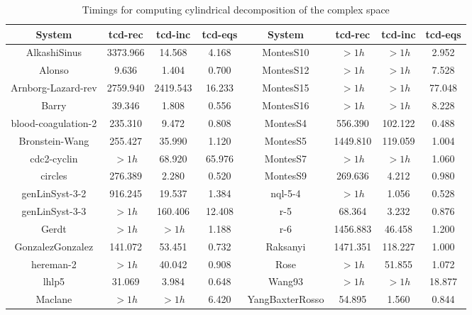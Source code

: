 \documentclass[10pt]{article}
\begin{document}
\begin{table}
\centering
\caption{Timings for computing cylindrical decomposition of the complex space}
\label{table:cd}
\begin{tabular}{|c|c|c|c||c|c|c|c|}\hline
System             & tcd-rec & tcd-inc & tcd-eqs & System & tcd-rec & tcd-inc & tcd-eqs \\ \hline
AlkashiSinus & 	  3373.966 & 	  14.568 & 	  4.168 &MontesS10 &  	 $> 1h$ &  	 $> 1h$ & 	  2.952 \\
Alonso & 	  9.636 & 	  1.404 & 	  0.700 &MontesS12 &  	 $> 1h$ &  	 $> 1h$ & 	  7.528 \\
Arnborg-Lazard-rev & 	  2759.940 & 	  2419.543 & 	  16.233 &MontesS15 &  	 $> 1h$ &  	 $> 1h$ & 	  77.048 \\
Barry & 	  39.346 & 	  1.808 & 	  0.556 &MontesS16 &  	 $> 1h$ &  	 $> 1h$ & 	  8.228 \\
blood-coagulation-2 & 	  235.310 & 	  9.472 & 	  0.808 &MontesS4 & 	  556.390 & 	  102.122 & 	  0.488 \\
Bronstein-Wang & 	  255.427 & 	  35.990 & 	  1.120 &MontesS5 & 	  1449.810 & 	  119.059 & 	  1.004 \\
cdc2-cyclin &  	 $> 1h$ & 	  68.920 & 	  65.976 &MontesS7 &  	 $> 1h$ &  	 $> 1h$ & 	  1.060 \\
circles & 	  276.389 & 	  2.280 & 	  0.520 &MontesS9 & 	  269.636 & 	  4.212 & 	  0.980 \\
genLinSyst-3-2 & 	  916.245 & 	  19.537 & 	  1.384 &nql-5-4 &  	 $> 1h$ & 	  1.056 & 	  0.528 \\
genLinSyst-3-3 &  	 $> 1h$ & 	  160.406 & 	  12.408 &r-5 & 	  68.364 & 	  3.232 & 	  0.876 \\
Gerdt &  	 $> 1h$ &  	 $> 1h$ & 	  1.188 &r-6 & 	  1456.883 & 	  46.458 & 	  1.200 \\
GonzalezGonzalez & 	  141.072 & 	  53.451 & 	  0.732 &Raksanyi & 	  1471.351 & 	  118.227 & 	  1.000 \\
hereman-2 &  	 $> 1h$ & 	  40.042 & 	  0.908 &Rose &  	 $> 1h$ & 	  51.855 & 	  1.072 \\
lhlp5 & 	  31.069 & 	  3.984 & 	  0.648 &Wang93 &  	 $> 1h$ &  	 $> 1h$ & 	  18.877 \\
Maclane &  	 $> 1h$ &  	 $> 1h$ & 	  6.420 &YangBaxterRosso & 	  54.895 & 	  1.560 & 	  0.844 \\
\hline
\end{tabular}
\end{table}
\end{document}
